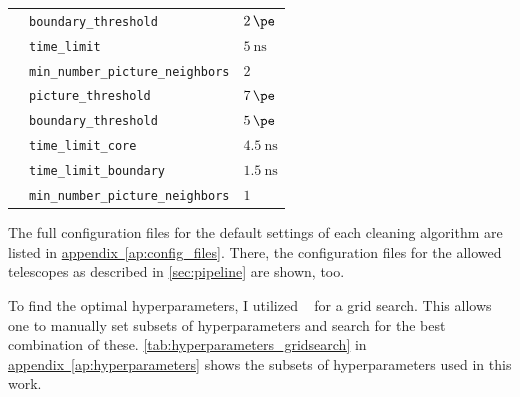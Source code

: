 \begin{table}
{\begin{tabular}{l l l}
                    & \texttt{boundary\_threshold}              & \qquad\(\SI{2}{\pe}\) \\
                    & \texttt{time\_limit}                      & \qquad\(\SI{5}{\nano\second}\) \\
                    & \texttt{min\_number\_picture\_neighbors}  & \qquad\(\num{2}\) \\
        \addlinespace[0.5em]
        \tcc{}      & \texttt{picture\_threshold}               & \qquad\(\SI{7}{\pe}\) \\
                    & \texttt{boundary\_threshold}              & \qquad\(\SI{5}{\pe}\) \\
                    & \texttt{time\_limit\_core}                & \qquad\(\SI{4.5}{\nano\second}\) \\
                    & \texttt{time\_limit\_boundary}            & \qquad\(\SI{1.5}{\nano\second}\) \\
                    & \texttt{min\_number\_picture\_neighbors}  & \qquad\(\num{1}\) \\
  \end{tabular}}
\end{table}

The full configuration files for the default settings of each cleaning algorithm are listed in
\hyperref[ap:config_files]{appendix~\ref{ap:config_files}}. There, the configuration files for the allowed telescopes
as described in \autoref{sec:pipeline} are shown, too.

To find the optimal hyperparameters, I utilized \sklearn{}~\cite{scikit-learn} for a grid search. This
allows one to manually set subsets of hyperparameters and search for the best combination of these.
\autoref{tab:hyperparameters_gridsearch} in \hyperref[ap:hyperparameters]{appendix~\ref{ap:hyperparameters}} shows
the subsets of hyperparameters used in this work.

